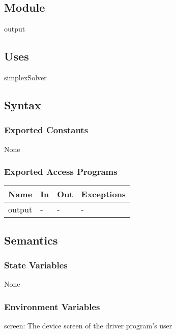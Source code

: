 \documentclass[12pt, titlepage]{article}
\begin{document}
\subsection{Module}

output

\subsection{Uses}

simplexSolver 

\subsection{Syntax}

\subsubsection{Exported Constants}

None

\subsubsection{Exported Access Programs}

\begin{center}
	\begin{tabular}{p{3cm} p{3cm} p{4cm} p{4cm}}
		\hline
		\textbf{Name} & \textbf{In} & \textbf{Out} & \textbf{Exceptions} \\
		\hline
		output & - & - & - \\
		\hline
	\end{tabular}
\end{center}

\subsection{Semantics}

\subsubsection{State Variables}

None

\subsubsection{Environment Variables}

screen: The device screen of the driver program's user
\end{document}
